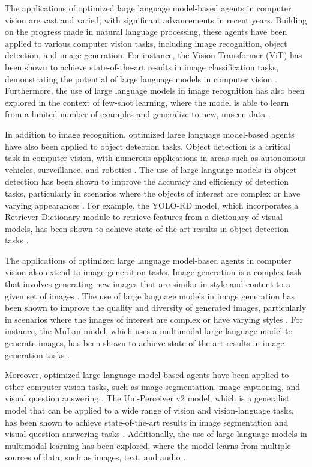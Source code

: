 \documentclass[11pt]{article}
\begin{document}
The applications of optimized large language model-based agents in computer vision are vast and varied, with significant advancements in recent years. Building on the progress made in natural language processing, these agents have been applied to various computer vision tasks, including image recognition, object detection, and image generation. For instance, the Vision Transformer (ViT) has been shown to achieve state-of-the-art results in image classification tasks, demonstrating the potential of large language models in computer vision \cite{ref229}. Furthermore, the use of large language models in image recognition has also been explored in the context of few-shot learning, where the model is able to learn from a limited number of examples and generalize to new, unseen data \cite{ref230}.

In addition to image recognition, optimized large language model-based agents have also been applied to object detection tasks. Object detection is a critical task in computer vision, with numerous applications in areas such as autonomous vehicles, surveillance, and robotics \cite{ref231}. The use of large language models in object detection has been shown to improve the accuracy and efficiency of detection tasks, particularly in scenarios where the objects of interest are complex or have varying appearances \cite{ref231}. For example, the YOLO-RD model, which incorporates a Retriever-Dictionary module to retrieve features from a dictionary of visual models, has been shown to achieve state-of-the-art results in object detection tasks \cite{ref232}.

The applications of optimized large language model-based agents in computer vision also extend to image generation tasks. Image generation is a complex task that involves generating new images that are similar in style and content to a given set of images \cite{ref233}. The use of large language models in image generation has been shown to improve the quality and diversity of generated images, particularly in scenarios where the images of interest are complex or have varying styles \cite{ref233}. For instance, the MuLan model, which uses a multimodal large language model to generate images, has been shown to achieve state-of-the-art results in image generation tasks \cite{ref233}.

Moreover, optimized large language model-based agents have been applied to other computer vision tasks, such as image segmentation, image captioning, and visual question answering \cite{ref234}. The Uni-Perceiver v2 model, which is a generalist model that can be applied to a wide range of vision and vision-language tasks, has been shown to achieve state-of-the-art results in image segmentation and visual question answering tasks \cite{ref234}. Additionally, the use of large language models in multimodal learning has been explored, where the model learns from multiple sources of data, such as images, text, and audio \cite{ref235}.
\end{document}
